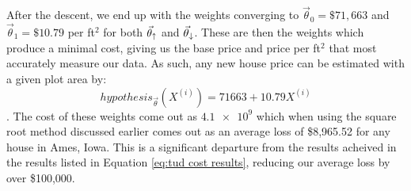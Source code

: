 
 After the descent, we
end up with the weights converging to $\vec\theta_0 = \$71,663$ and
$\vec\theta_1 = \$10.79$ per ft$^2$ for both $\vec\theta_{\uparrow}$ and $\vec\theta_{\downarrow}$. These are then the
weights which produce a minimal cost, giving us the base price and price per
ft$^2$ that most accurately measure our data. As such, any new house price can
be estimated with a given plot area by:
\begin{equation}
    hypothesis_{\vec\theta}(X^{(i)}) = 71663 + 10.79X^{(i)}	
\end{equation}.
The cost of these weights come out as $\num{4.1e9}$ which when using the
square root method discussed earlier comes out as an average loss of \$8,965.52
for any house in Ames, Iowa. This is a significant departure from the results
acheived in the results listed in Equation \ref{eq:tud cost results}, reducing our
average loss by over \$100,000.



